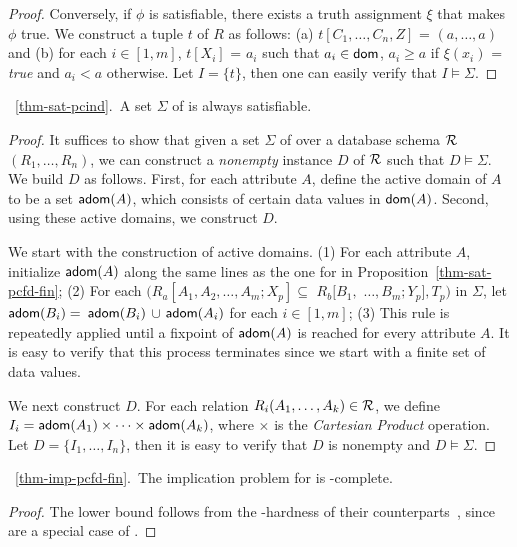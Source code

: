 {\begin{proof}
Conversely, if $\phi$ is satisfiable, there exists a truth
assignment $\xi$ that makes $\phi$ true. We construct a tuple $t$ of
$R$ as follows: (a) $t[C_1,\ldots, C_n, Z]$ = $(a, \ldots, a)$ and
(b) for each $i\in[1, m]$, $t[X_i]$ = $a_i$ such that $a_i\in\protect\mathsf{dom}$,
$a_i\ge a$ if $\xi(x_i)$ = {\em true} and $a_i< a$ otherwise. Let $I
= \{t\}$, then one can easily verify that $I\models\Sigma$. \eop
\end{proof}


\vspace{2ex} \noindent{}~\ref{thm-sat-pcind}.~A set
$\Sigma$ of \pCINDs is always satisfiable. \eop


\begin{proof} It suffices to show that given a set $\Sigma$ of \pCINDs over a
database schema $\cal R$$(R_1,\ldots,R_n)$, we can construct a {\em
nonempty} instance $D$ of $\cal R$ such that $D \models \Sigma$. We
build $D$ as follows. First, for each attribute $A$, define the
active domain of $A$ to be a set ${\mathsf{adom}}(A)$, which consists of
certain data values in $\protect\mathsf{dom}(A)$. Second, using these active
domains, we construct $D$.

We start with the construction of active domains. (1) For each
attribute $A$, initialize ${\mathsf{adom}}(A)$ along the same lines as the one
for \pCFDs in Proposition~\ref{thm-sat-pcfd-fin}; (2) For each
\pCIND $(R_a[A_1,A_2,\ldots,A_m;X_p] \subseteq$ $R_b[B_1,$
$\ldots,B_m;Y_p], T_p)$ in $\Sigma$, let ${\mathsf{adom}}(B_i)=$ ${\mathsf{adom}}(B_i)$
$\cup$ ${\mathsf{adom}}(A_i)$ for each $i\in [1,m]$; (3) This rule is
repeatedly applied until a fixpoint of ${\mathsf{adom}}(A)$ is reached for
every attribute $A$. It is easy to verify that this process
terminates since we start with a finite set of data values.

We next construct $D$. For each relation $R_i(A_1,\dots,A_k) \in
{\cal R}$, we define $I_i = {\mathsf{adom}}(A_1)\times \dots \times
{\ensuremath {\mathsf{adom}}}(A_k)$, where $\times$ is the {\em Cartesian Product}
operation. Let $D = \{I_1,\dots,I_n\}$, then it is easy to verify
that $D$ is nonempty and $D \models \Sigma$. \eop
\end{proof}



\vspace{2ex} \noindent{}~\ref{thm-imp-pcfd-fin}.~The
implication problem for \pCFDs is \coNP-complete. \eop

\begin{proof}
The lower bound follows from the \coNP-hardness of their \CFDs
counterparts~\cite{CFDs}, since \CFDs are a special case of \pCFDs.


\end{proof}}
